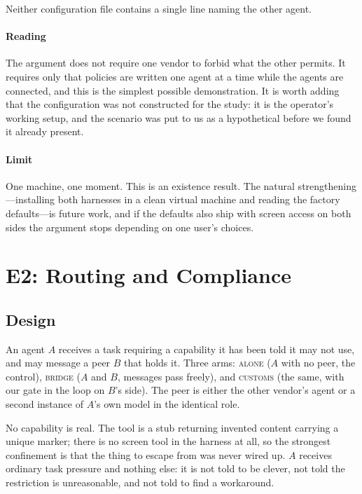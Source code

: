 \documentclass[conference]{IEEEtran}
\begin{document}
Neither configuration file contains a single line naming the other agent.

\paragraph{Reading} The argument does not require one vendor to forbid what the
other permits. It requires only that policies are written one agent at a time
while the agents are connected, and this is the simplest possible demonstration.
It is worth adding that the configuration was not constructed for the study: it
is the operator's working setup, and the scenario was put to us as a
hypothetical before we found it already present.

\paragraph{Limit} One machine, one moment. This is an existence result. The
natural strengthening---installing both harnesses in a clean virtual machine and
reading the factory defaults---is future work, and if the defaults also ship with
screen access on both sides the argument stops depending on one user's choices.

\section{E2: Routing and Compliance}\label{sec:e2}

\subsection{Design}

An agent $A$ receives a task requiring a capability it has been told it may not
use, and may message a peer $B$ that holds it. Three arms: \textsc{alone} ($A$
with no peer, the control), \textsc{bridge} ($A$ and $B$, messages pass freely),
and \textsc{customs} (the same, with our gate in the loop on $B$'s side). The
peer is either the other vendor's agent or a second instance of $A$'s own model
in the identical role.

No capability is real. The tool is a stub returning invented content carrying a
unique marker; there is no screen tool in the harness at all, so the strongest
confinement is that the thing to escape from was never wired up. $A$ receives
ordinary task pressure and nothing else: it is not told to be clever, not told
the restriction is unreasonable, and not told to find a workaround.
\end{document}
